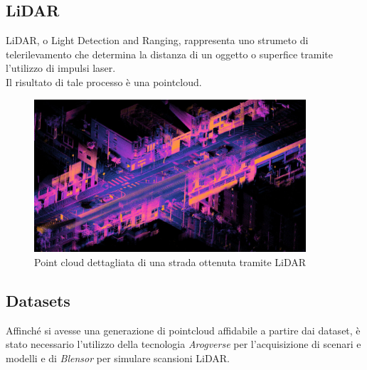 \documentclass[italian]{article}
\begin{document}
\subsection{LiDAR}
LiDAR, o Light Detection and Ranging, rappresenta uno strumeto di telerilevamento che determina la distanza di un oggetto o superfice tramite l'utilizzo di impulsi laser.\\
Il risultato di tale processo è una pointcloud.\\
\begin{figure}[H]
	\centering
	\includegraphics[width=0.9\textwidth]{LiDAR}
	\footnotesize
	\caption{Point cloud dettagliata di una strada ottenuta tramite LiDAR}
\end{figure}
\subsection{Datasets}
Affinché si avesse una generazione di pointcloud affidabile a partire dai dataset, è stato necessario l'utilizzo della tecnologia \textit{Arogverse} per l'acquisizione di scenari e modelli e di \textit{Blensor} per simulare scansioni LiDAR.
\end{document}
